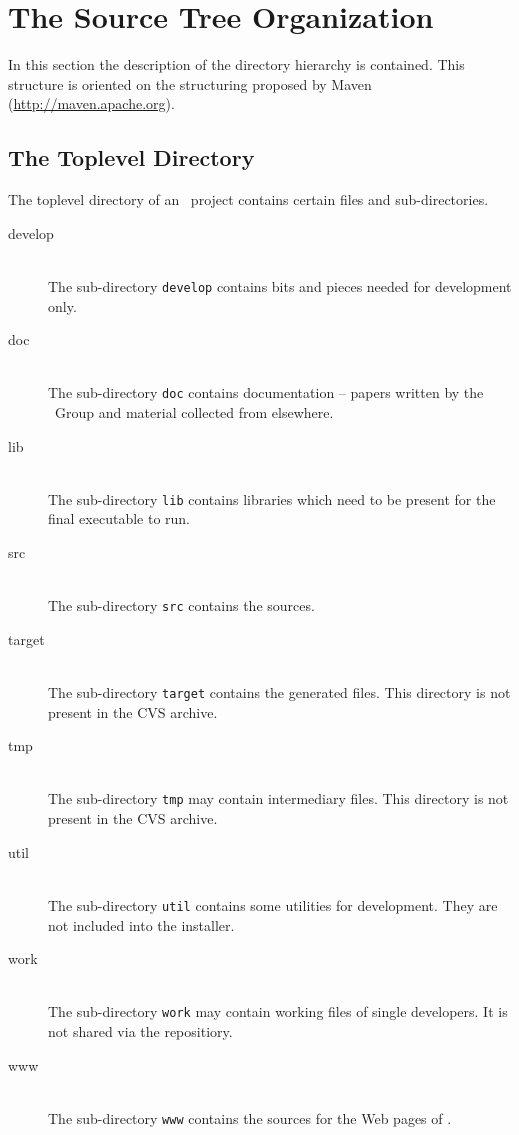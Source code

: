 \chapter{The Source Tree Organization}

In this section the description of the directory hierarchy is
contained. This structure is oriented on the structuring proposed by
Maven (\url{http://maven.apache.org}).


\section{The Toplevel Directory}

The toplevel directory of an \ExTeX\ project contains certain files
and sub-directories.

\begin{description}
\item[develop] \ \\
  The sub-directory \texttt{develop} contains bits and pieces needed
  for development only.
\item[doc]  \ \\
  The sub-directory \texttt{doc} contains documentation -- papers
  written by the \ExTeX\ Group and material collected from elsewhere.
\item[lib]  \ \\
  The sub-directory \texttt{lib} contains libraries which need to be
  present for the final executable to run.
\item[src]  \ \\
  The sub-directory \texttt{src} contains the sources.
\item[target]  \ \\
  The sub-directory \texttt{target} contains the generated files. This
  directory is not present in the CVS archive.
\item[tmp]  \ \\
  The sub-directory \texttt{tmp} may contain intermediary files. This
  directory is not present in the CVS archive.
\item[util]  \ \\
  The sub-directory \texttt{util} contains some utilities for
  development. They are not included into the installer.
\item[work]  \ \\
  The sub-directory \texttt{work} may contain working files of single
  developers. It is not shared via the repositiory.
\item[www]  \ \\
  The sub-directory \texttt{www} contains the sources for the Web pages
  of \ExTeX.
\end{description}

